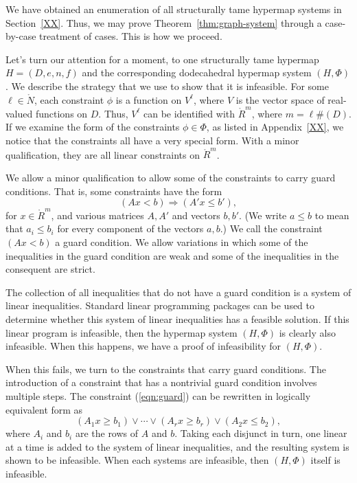 We have obtained an enumeration of all structurally tame
hypermap systems in Section~\ref{XX}.  Thus,  we may prove
Theorem~\ref{thm:graph-system} through a case-by-case treatment
of cases.  This is how we proceed.

Let's turn our attention for a moment, to one structurally tame hypermap $H=(D,e,n,f)$ and the corresponding dodecahedral hypermap system $(H,\Phi)$.
We describe the strategy that we use to show that it is infeasible.
For some $\ell\in\ring{N}$,
each constraint $\phi$ is a function on $V^\ell$, where $V$ is
the vector space of real-valued functions on $D$.  Thus,
$V^\ell$ can be identified with $\ring{R}^m$, where $m= \ell \#(D)$.
If we examine the form of the constraints $\phi\in \Phi$, as listed
in Appendix~\ref{XX}, we notice that the constraints all have a 
very special form.  With a minor qualification, they are all linear constraints
on $\ring{R}^m$.  

We allow a minor qualification to allow some of the constraints
to carry guard conditions.  That is, some constraints have the form
  \begin{equation}\label{eqn:guard}
  (A x < b)  \Rightarrow (A' x \le b'),
  \end{equation}
for $x\in\ring{R}^m$, and various matrices $A,A'$ and vectors
$b,b'$.  (We write $a \le b$ to mean
that $a_i\le b_i$ for every component of the vectors $a,b$.)
We call the constraint $(A x < b)$ a guard condition.
We allow variations in which some of the inequalities in the
guard condition are weak and some of the inequalities in the
consequent are strict.

The collection of all inequalities that do not have a guard 
condition is a system of linear inequalities.  Standard linear
programming packages can be used to determine whether this
system of linear inequalities has a feasible solution.  If this
linear program is infeasible, then the hypermap system $(H,\Phi)$
is clearly also infeasible.  When this happens, we have a
proof of infeasibility for $(H,\Phi)$.

When this fails, we turn to the constraints that carry guard
conditions.
The introduction of a constraint that has a nontrivial guard condition
involves multiple steps.  
The constraint (\ref{eqn:guard}) can be rewritten in logically
equivalent form as
  $$
   (A_{1} x \ge b_{1}) \lor \cdots \lor
   (A_{r} x \ge b_{r}) \lor (A_2 x \le b_2),
  $$
where $A_{i}$ and $b_{i}$ are the rows of $A$ and $b$.
Taking each disjunct in turn, one linear at a time
is added to the system
of linear inequalities, and the resulting system is shown to be
infeasible.  When each
systems are infeasible, then $(H,\Phi)$ itself is infeasible.

